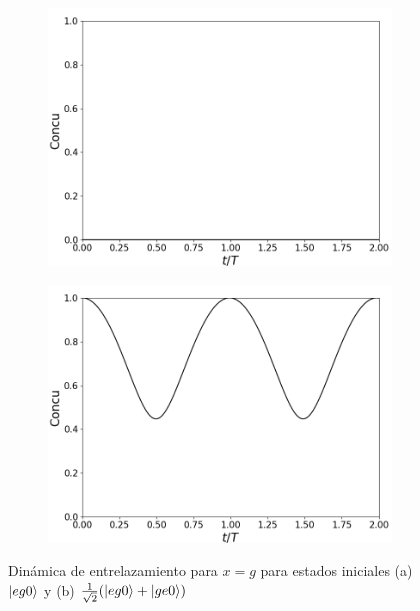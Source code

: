\begin{figure}[h]
    \centering
    \begin{subfigure}{0.49\textwidth}
        \includegraphics[width=\textwidth]{figuras/ch4/x eg0 concu.png}
        \caption{}
        \label{fig4:concu x eg0}
    \end{subfigure}
    \hfill
    \begin{subfigure}{0.49\textwidth}
        \includegraphics[width=\textwidth]{figuras/ch4/x eg0+ concu.png}
        \caption{}
        \label{fig4:concu x eg0 sim}
    \end{subfigure}
    \caption{Dinámica de entrelazamiento para $x=g$ para estados iniciales (a) $\ket{eg0}$ y (b) $\frac{1}{\sqrt{2}}(\ket{eg0}+\ket{ge0})$}
    \label{fig4:concu x}
\end{figure}
